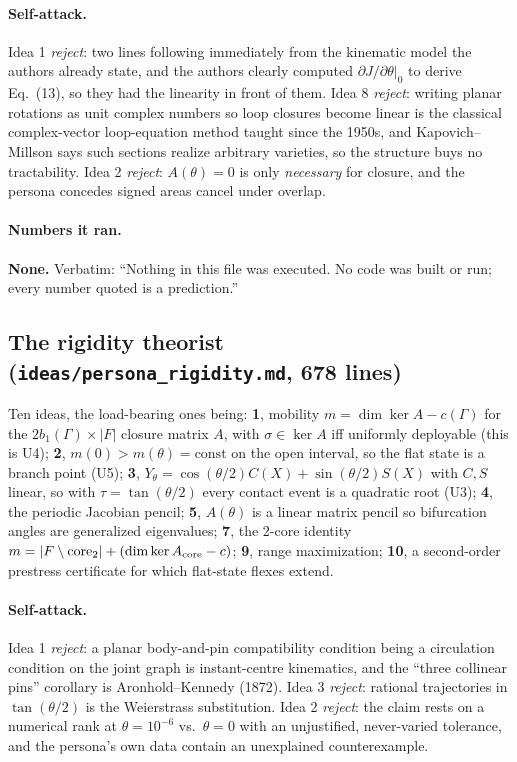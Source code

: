 \documentclass[10pt,a4paper]{article}
\begin{document}
\paragraph{Self-attack.} Idea 1 \emph{reject}: two lines following immediately from the
kinematic model the authors already state, and the authors clearly computed
$\partial J/\partial\theta|_0$ to derive Eq.~(13), so they had the linearity in front of them.
Idea 8 \emph{reject}: writing planar rotations as unit complex numbers so loop closures become
linear is the classical complex-vector loop-equation method taught since the 1950s, and
Kapovich--Millson says such sections realize arbitrary varieties, so the structure buys no
tractability. Idea 2 \emph{reject}: $A(\theta)=0$ is only \emph{necessary} for closure, and the
persona concedes signed areas cancel under overlap.

\paragraph{Numbers it ran.} \textbf{None.} Verbatim: ``Nothing in this file was executed. No
code was built or run; every number quoted is a prediction.''

\subsection{The rigidity theorist (\texttt{ideas/persona\_rigidity.md}, 678 lines)}

Ten ideas, the load-bearing ones being: \textbf{1}, mobility $m = \dim\ker A - c(\Gamma)$ for the
$2b_1(\Gamma)\times|F|$ closure matrix $A$, with $\sigma\in\ker A$ iff uniformly deployable
(this is U4); \textbf{2}, $m(0) > m(\theta) = \text{const}$ on the open interval, so the flat
state is a branch point (U5); \textbf{3}, $Y_\theta = \cos(\theta/2)C(X)+\sin(\theta/2)S(X)$
with $C,S$ linear, so with $\tau = \tan(\theta/2)$ every contact event is a quadratic root
(U3); \textbf{4}, the periodic Jacobian pencil; \textbf{5}, $A(\theta)$ is a linear matrix
pencil so bifurcation angles are generalized eigenvalues; \textbf{7}, the 2-core identity
$m = |F\setminus\mathrm{core}_2| + (\dim\ker A_{\rm core} - c)$; \textbf{9}, range maximization;
\textbf{10}, a second-order prestress certificate for which flat-state flexes extend.

\paragraph{Self-attack.} Idea 1 \emph{reject}: a planar body-and-pin compatibility condition
being a circulation condition on the joint graph is instant-centre kinematics, and the ``three
collinear pins'' corollary is Aronhold--Kennedy (1872). Idea 3 \emph{reject}: rational
trajectories in $\tan(\theta/2)$ is the Weierstrass substitution. Idea 2 \emph{reject}: the
claim rests on a numerical rank at $\theta = 10^{-6}$ vs.\ $\theta=0$ with an unjustified,
never-varied tolerance, and the persona's own data contain an unexplained counterexample.
\end{document}

